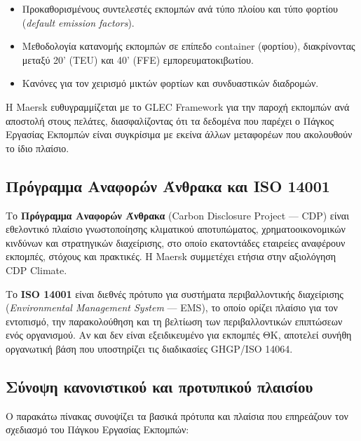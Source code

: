 \documentclass[11pt,a4paper,greek,twoside]{template-xe}
\providecommand{\tightlist}{\setlength{\itemsep}{0pt}\setlength{\parskip}{0pt}}
\begin{document}
\begin{itemize}
\tightlist
\item
  Προκαθορισμένους συντελεστές εκπομπών ανά τύπο πλοίου και τύπο φορτίου
  (\emph{default emission factors}).
\item
  Μεθοδολογία κατανομής εκπομπών σε επίπεδο container (φορτίου),
  διακρίνοντας μεταξύ 20' (TEU) και 40' (FFE) εμπορευματοκιβωτίου.
\item
  Κανόνες για τον χειρισμό μικτών φορτίων και συνδυαστικών διαδρομών.
\end{itemize}

Η Maersk ευθυγραμμίζεται με το GLEC Framework για την παροχή εκπομπών
ανά αποστολή στους πελάτες, διασφαλίζοντας ότι τα δεδομένα που παρέχει ο
Πάγκος Εργασίας Εκπομπών είναι συγκρίσιμα με εκείνα άλλων μεταφορέων που
ακολουθούν το ίδιο πλαίσιο.

\subsection{Πρόγραμμα Αναφορών Άνθρακα και ISO
14001}\label{ux3c0ux3c1ux3ccux3b3ux3c1ux3b1ux3bcux3bcux3b1-ux3b1ux3bdux3b1ux3c6ux3bfux3c1ux3ceux3bd-ux3acux3bdux3b8ux3c1ux3b1ux3baux3b1-ux3baux3b1ux3b9-iso-14001}

Το \textbf{Πρόγραμμα Αναφορών Άνθρακα} (Carbon Disclosure Project ---
CDP) είναι εθελοντικό πλαίσιο γνωστοποίησης κλιματικού αποτυπώματος,
χρηματοοικονομικών κινδύνων και στρατηγικών διαχείρισης, στο οποίο
εκατοντάδες εταιρείες αναφέρουν εκπομπές, στόχους και πρακτικές. Η
Maersk συμμετέχει ετήσια στην αξιολόγηση CDP Climate.

Το \textbf{ISO 14001} είναι διεθνές πρότυπο για συστήματα
περιβαλλοντικής διαχείρισης (\emph{Environmental Management System} ---
EMS), το οποίο ορίζει πλαίσιο για τον εντοπισμό, την παρακολούθηση και
τη βελτίωση των περιβαλλοντικών επιπτώσεων ενός οργανισμού. Αν και δεν
είναι εξειδικευμένο για εκπομπές ΘΚ, αποτελεί συνήθη οργανωτική βάση που
υποστηρίζει τις διαδικασίες GHGP/ISO 14064.

\subsection{Σύνοψη κανονιστικού και προτυπικού
πλαισίου}\label{ux3c3ux3cdux3bdux3bfux3c8ux3b7-ux3baux3b1ux3bdux3bfux3bdux3b9ux3c3ux3c4ux3b9ux3baux3bfux3cd-ux3baux3b1ux3b9-ux3c0ux3c1ux3bfux3c4ux3c5ux3c0ux3b9ux3baux3bfux3cd-ux3c0ux3bbux3b1ux3b9ux3c3ux3afux3bfux3c5}

Ο παρακάτω πίνακας συνοψίζει τα βασικά πρότυπα και πλαίσια που
επηρεάζουν τον σχεδιασμό του Πάγκου Εργασίας Εκπομπών:
\end{document}
